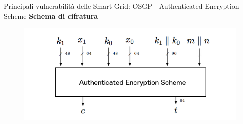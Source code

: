 \begin{frame}{Principali vulnerabilità delle Smart Grid: OSGP - Authenticated Encryption Scheme}
	\textbf{Schema di cifratura}
	\begin{figure}[h] 
		\includegraphics[scale=0.4,cfbox=blue_slides 1pt 0pt]{imgs/c_scheme.png}
	\end{figure}
\end{frame}
